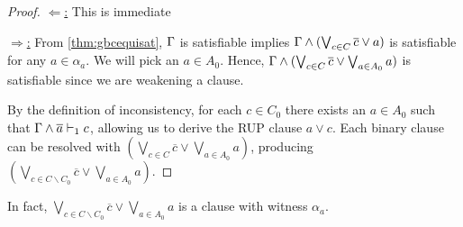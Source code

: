 \begin{proof}
    \underline{$\Leftarrow$:} This is immediate


    \underline{$\Rightarrow$:} From \autoref{thm:gbcequisat}, $\Gamma$ is
    satisfiable implies $\Gamma \land (\bigvee_{c \in C} \overline{c} \lor a)$
    is satisfiable for any $a \in \alpha_a$. We will pick an $a \in A_0$. Hence,
    $\Gamma \land (\bigvee_{c \in C} \overline{c} \lor \bigvee_{a \in A_0} a)$
    is satisfiable since we are weakening a clause.


    
    By the definition of inconsistency, for each $c \in C_0$ there exists an $a
    \in A_0$ such that $\Gamma \land \overline{a} \vdash_1 c$, allowing us to derive
    the RUP clause  $a \lor c$. Each binary clause can be resolved with $
    (\bigvee_{c \in C} \overline{c} \lor \bigvee_{a \in A_0} a)$, producing
    $(\bigvee_{c \in C \backslash C_0} \overline{c} \lor \bigvee_{a \in A_0}
    a)$. 
    

%
%
\end{proof}

In fact, $\bigvee_{c \in C \backslash C_0} \overline{c} \lor \bigvee_{a \in A_0}
a$ is a \pr clause with witness $\alpha_a$. 



